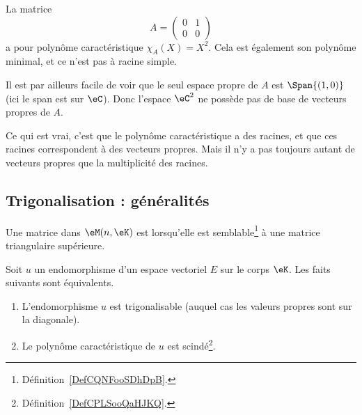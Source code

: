 \begin{example}
    La matrice
    \begin{equation}
        A=\begin{pmatrix}
            0    &   1    \\
            0    &   0
        \end{pmatrix}
    \end{equation}
    a pour polynôme caractéristique \( \chi_A(X)=X^2\). Cela est également son polynôme minimal, et ce n'est pas à racine simple.

    Il est par ailleurs facile de voir que le seul espace propre de \( A\) est \( \Span\{ (1,0) \}\) (ici le span est sur \( \eC\)). Donc l'espace \( \eC^2\) ne possède pas de base de vecteurs propres de \( A\).
\end{example}

Ce qui est vrai, c'est que le polynôme caractéristique a des racines, et que ces racines correspondent à des vecteurs propres. Mais il n'y a pas toujours autant de vecteurs propres que la multiplicité des racines.

\subsection{Trigonalisation : généralités}

\begin{definition}
    Une matrice dans \( \eM(n,\eK)\) est  lorsqu'elle est semblable\footnote{Définition~\ref{DefCQNFooSDhDpB}.} à une matrice triangulaire supérieure.
\end{definition}

\begin{proposition} \label{PropKNVFooQflQsJ}
    Soit \( u\) un endomorphisme d'un espace vectoriel \( E\) sur le corps \( \eK\). Les faits suivants sont équivalents.
    \begin{enumerate}
        \item   \label{ItemZKDMooOrTHkwi}
            L'endomorphisme \( u\) est trigonalisable (auquel cas les valeurs propres sont sur la diagonale).
        \item   \label{ItemZKDMooOrTHkwii}
            Le polynôme caractéristique de \( u\) est scindé\footnote{Définition~\ref{DefCPLSooQaHJKQ}.}.
    \end{enumerate}
\end{proposition}

